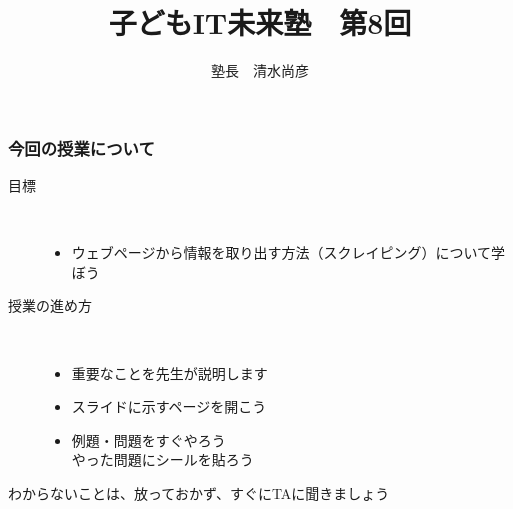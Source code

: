 \documentclass[dvipdfmx]{beamer}
\title{子どもIT未来塾　第8回}
\author{塾長　清水尚彦}
\begin{document}

\begin{frame}[fragile]
	\frametitle{今回の授業について ~~~}
		\begin{description}
			\item[目標] ~\\
				\begin{itemize}
					\item ウェブページから情報を取り出す方法（スクレイピング）について学ぼう
				\end{itemize}

			\item[授業の進め方]~\\
				\begin{itemize}
					\item 重要なことを先生が説明します
					\item スライドに示すページを開こう
					\item 例題・問題をすぐやろう\\
						やった問題にシールを貼ろう
				\end{itemize}
		\end{description}
		\vfill
		わからないことは、放っておかず、すぐにTAに聞きましょう
\end{frame}
\end{document}

